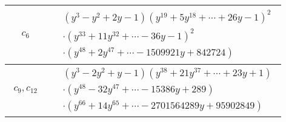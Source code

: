 \documentclass[1p]{elsarticle_modified}
\theoremstyle{definition}
\begin{document}
\begin{tabular}{m{50pt}|m{274pt}}
\hline $$\begin{aligned}c_{6}\end{aligned}$$&$\begin{aligned}
&(y^3- y^2+2 y-1)(y^{19}+5 y^{18}+\cdots+26 y-1)^{2}\\
&\cdot(y^{33}+11 y^{32}+\cdots-36 y-1)^{2}\\
&\cdot(y^{48}+2 y^{47}+\cdots-1509921 y+842724)
\end{aligned}$\\
\hline $$\begin{aligned}c_{9},c_{12}\end{aligned}$$&$\begin{aligned}
&(y^3-2 y^2+y-1)(y^{38}+21 y^{37}+\cdots+23 y+1)\\
&\cdot(y^{48}-32 y^{47}+\cdots-15386 y+289)\\
&\cdot(y^{66}+14 y^{65}+\cdots-2701564289 y+95902849)
\end{aligned}$\\
\hline
\end{tabular}
\vskip 2pc
\end{document}
